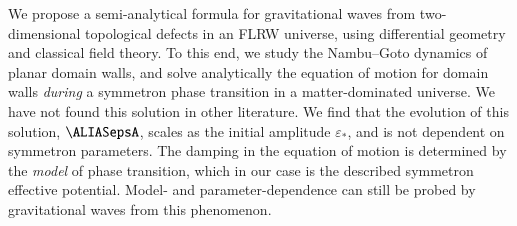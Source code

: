 

\newcommand{\wallsep}{\ALIASwallsep}
\newcommand\hpA{\ALIAShpA}
\newcommand\hpB{\ALIAShpB}
\newcommand\hpC{\ALIAShpC}
\newcommand\hpAB{\ALIAShpAB}
\newcommand\hpCR{\ALIAShpCR}
\newcommand\hpCI{\ALIAShpCI}
\newcommand\epsA{\ALIASepsA}
\newcommand\epsB{\ALIASepsB}
\newcommand\epsC{\ALIASepsC}









We propose a semi-analytical formula for gravitational waves from two-dimensional topological defects in an FLRW universe, using differential geometry and classical field theory. 
To this end, we study the Nambu--Goto dynamics of planar domain walls, and solve analytically the equation of motion for domain walls \emph{during} a symmetron phase transition in a matter-dominated universe. 
We have not found this solution in other literature. We find that the evolution of this solution, $\epsA$, scales as the initial amplitude $\varepsilon_\ast$, and is not dependent on symmetron parameters. 
The damping in the equation of motion is determined by the \emph{model} of phase transition, which in our case is the described symmetron effective potential. Model- and parameter-dependence can still be probed by gravitational waves from this phenomenon. 



